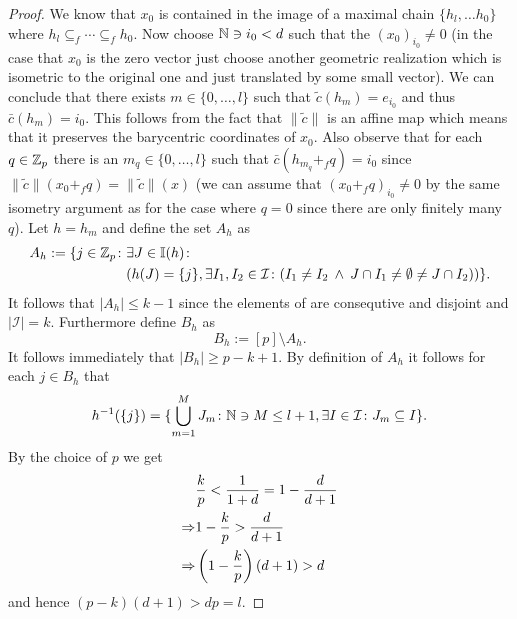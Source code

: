 \begin{proof}
  We know that $x_0$ is contained in the image of a maximal chain $\{h_l, \ldots h_0\}$ where $h_l \subseteq_f \cdots \subseteq_f h_0$.
  Now choose $\mathbb{N} \ni i_0 < d$ such that the $(x_0)_{i_0} \neq 0$ (in the case that $x_0$ is the zero vector just choose another geometric realization which is isometric to the original one and just translated by some small vector). We can conclude that there exists $m \in \{0, \ldots, l\}$ such that $\tilde{c}(h_m) = e_{i_0}$ and thus $\bar{c}(h_m) = i_0$. This follows from the fact that $\lVert \tilde{c} \rVert$ is an affine map which means that it preserves the barycentric coordinates of $x_0$. Also observe that for each $q \in \mathbb{Z}_p$ there is an $m_q \in \{0,\ldots,l\}$ such that $\bar{c}(h_{m_q}+_fq) = i_0$ since $\lVert \tilde{c} \rVert(x_0 +_f q) = \lVert \tilde{c} \rVert(x)$ (we can assume that $(x_0 +_f q)_{i_0} \neq 0$ by the same isometry argument as for the case where $q = 0$ since there are only finitely many $q$). 
  Let $h = h_m$ and define the set $A_h$ as
  \begin{align*} 
    A_h := \{j \in \mathbb{Z}_p\colon &\exists J \in \mathbb{I}(h)\colon\\
    &(h(J) = \{j\}, \exists I_1, I_2 \in \mathcal{I}\colon (I_1\neq I_2 \: \land \: J \cap I_1 \neq \emptyset \neq J \cap I_2)) \}.
  \end{align*}
  It follows that $\left|A_h\right| \leq k-1$ since the elements of are consequtive and disjoint and $\left|\mathcal{I}\right| = k$. Furthermore define $B_h$ as \[B_h:= [p] \setminus A_h.\] 
  It follows immediately that $\left|B_h \right| \geq p - k + 1$. By definition of $A_h$ it follows for each $j \in B_h$ that
  \begin{equation*}
    h^{-1}(\{j\}) = \{\bigcup\limits_{m=1}^M J_m\colon \mathbb{N} \ni M \leq l+1, \exists I \in \mathcal{I}\colon J_m \subseteq I\}.
  \end{equation*}
  By the choice of $p$ we get
  \begin{align*}
    &{k \over p} < {1 \over 1+d} = 1 - {d \over d + 1} \\
    \Rightarrow &1 - {k \over p} > {d \over d+1} \\
    \Rightarrow &\left(1 - {k\over p}\right)(d+1) > d
  \end{align*}
  and hence $(p-k)(d+1) > dp = l$.
  

\end{proof}
